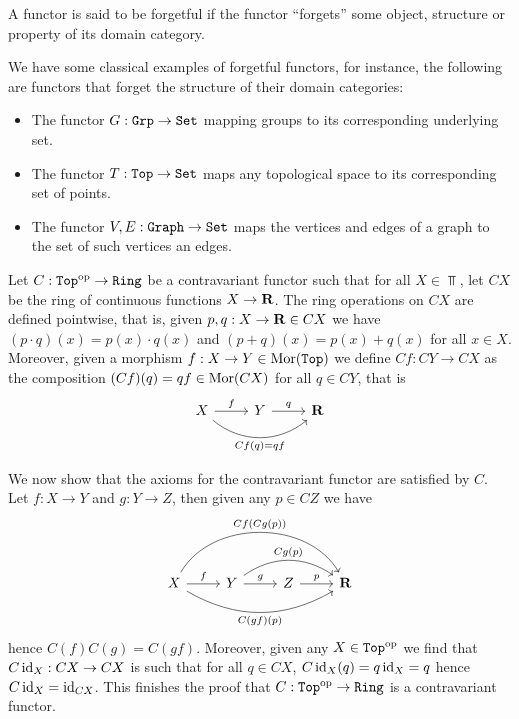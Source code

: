 \begin{definition}
    A functor is said to be forgetful if the functor ``forgets'' some object,
    structure or property of its domain category.
\end{definition}

\begin{example}
    We have some classical examples of forgetful functors, for instance, the
    following are functors that forget the structure of their domain categories:
    \begin{itemize}
        \item The functor \(G: {\texttt{Grp}} \to {\texttt{Set}}\) mapping groups to its corresponding
              underlying set.
        \item The functor \(T: {\texttt{Top}} \to {\texttt{Set}}\) maps any topological space
              to its corresponding set of points.
        \item The functor \(V, E: {\texttt{Graph}} \to {\texttt{Set}}\) maps the vertices and
              edges of a graph to the set of such vertices an edges.
    \end{itemize}
\end{example}

\begin{example}[\(\Top^\op \to \Rng\)]
    Let \(C: {\texttt{Top}}^{\mathrm{op}} \to {\texttt{Ring}}\) be a contravariant functor such that
    for all \(X \in \Top\), let \(C X\) be the ring of continuous functions
    \(X \to \mathbf{R}\). The ring operations on \(C X\) are defined pointwise,
    that is, given \(p, q: X \to \mathbf{R} \in C X\) we have \((p \cdot q) (x) =
    p(x) \cdot q(x)\) and \((p + q)(x) = p(x) + q(x)\) for all \(x \in X\).
    Moreover, given a morphism \(f: X \to Y \in \operatorname{Mor}({\texttt{Top}})\) we define \(C f:
    C Y \to C X\) as the composition \((C f)(q) = q f \in \operatorname{Mor}(C X)\) for all \(q
    \in C Y\), that is
    \[
        \begin{tikzcd}
            X \ar[r, "f"] \ar[rr, bend right = 40, swap, "C f(q) = q f"]
            & Y \ar[r, "q"] & \R
        \end{tikzcd}
    \]

    We now show that the axioms for the contravariant functor are satisfied by
    \(C\). Let \(f: X \to Y\) and \(g: Y \to Z\), then given any \(p \in C Z\) we
    have
    \[
        \begin{tikzcd}
            X \ar[r, "f"]
            \ar[rrr, bend left = 60, "C f(C g (p))"]
            \ar[rrr, bend right, swap, "C (g f)(p)"]
            & Y \ar[r, "g"]
            \ar[rr, bend left = 35, "C g(p)"]
            & Z \ar[r, "p"] & \R
        \end{tikzcd}
    \]
    hence \(C (f) C (g) = C (g f)\). Moreover, given any \(X \in {\texttt{Top}}^{\mathrm{op}}\) we find
    that \(C \operatorname{id}_X: C X \to C X\) is such that for all \(q \in C X\),
    \(C \operatorname{id}_X (q) = q \operatorname{id}_X = q\) hence \(C \operatorname{id}_X = \operatorname{id}_{C X}\). This finishes the
    proof that \(C: {\texttt{Top}}^{\mathrm{op}} \to {\texttt{Ring}}\) is a contravariant functor.
\end{example}

